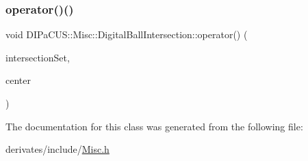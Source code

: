 \mbox{\label{classDIPaCUS_1_1Misc_1_1DigitalBallIntersection_aa7e9ee375a80f5746cfc066666b0615d}} 
\subsubsection{\texorpdfstring{operator()()}{operator()()}}
{\footnotesize\ttfamily void D\+I\+Pa\+C\+U\+S\+::\+Misc\+::\+Digital\+Ball\+Intersection\+::operator() (\begin{DoxyParamCaption}\item[{\mbox{\hyperlink{classDIPaCUS_1_1Misc_1_1DigitalBallIntersection_aaed19d165964a423d69f19a3de0d5587}{Digital\+Set}} \&}]{intersection\+Set,  }\item[{\mbox{\hyperlink{classDIPaCUS_1_1Misc_1_1DigitalBallIntersection_a7e348073cb818df2e225d22746e1d6af}{Point}}}]{center }\end{DoxyParamCaption})\hspace{0.3cm}{\ttfamily [inline]}}



The documentation for this class was generated from the following file\+:\begin{DoxyCompactItemize}
\item 
derivates/include/\mbox{\hyperlink{Misc_8h}{Misc.\+h}}\end{DoxyCompactItemize}
